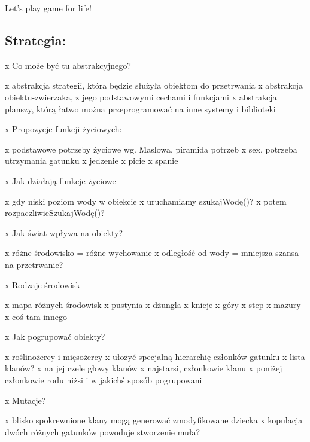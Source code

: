 Let's play game for life!

\subsection*{Strategia\-:}

x Co może być tu abstrakcyjnego? \begin{DoxyVerb}    x abstrakcja strategii, która będzie służyła obiektom do przetrwania
    x abstrakcja obiektu-zwierzaka, z jego podstawowymi cechami i funkcjami
    x abstrakcja planszy, którą łatwo można przeprogramować na inne systemy i biblioteki
\end{DoxyVerb}


x Propozycje funkcji życiowych\-: \begin{DoxyVerb}    x podstawowe potrzeby życiowe wg. Maslowa, piramida potrzeb    
    x sex, potrzeba utrzymania gatunku
    x jedzenie
    x picie
    x spanie
\end{DoxyVerb}


x Jak działają funkcje życiowe \begin{DoxyVerb}    x gdy niski poziom wody w obiekcie
            x uruchamiamy szukajWodę()?
                    x potem rozpaczliwieSzukajWodę()?
\end{DoxyVerb}


x Jak świat wpływa na obiekty? \begin{DoxyVerb}    x różne środowisko = różne wychowanie
    x odległość od wody = mniejsza szansa na przetrwanie?
\end{DoxyVerb}


x Rodzaje środowisk \begin{DoxyVerb}    x mapa różnych środowisk
    x pustynia
    x dżungla
    x knieje
    x góry
    x step
    x mazury
    x coś tam innego
\end{DoxyVerb}


x Jak pogrupować obiekty? \begin{DoxyVerb}    x roślinożercy i mięsożercy
    x ułożyć specjalną hierarchię członków gatunku
    x lista klanów? 
            x na jej czele głowy klanów
            x najstarsi, członkowie klanu
            x poniżej członkowie rodu niżsi i w jakichś sposób pogrupowani
\end{DoxyVerb}


x Mutacje? \begin{DoxyVerb}    x blisko spokrewnione klany mogą generować zmodyfikowane dziecka
    x kopulacja dwóch różnych gatunków powoduje stworzenie muła?
\end{DoxyVerb}


